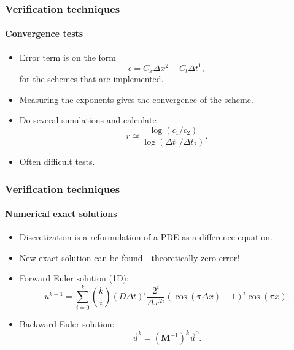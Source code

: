 \documentclass[12pt,a4paper, xcolor={usenames,dvipsnames,svgnames,table}]{beamer}
\begin{document}
\begin{frame}[shrink]
\frametitle{Verification techniques}
\framesubtitle{Convergence tests}
\begin{itemize}
 \item<1-> Error term is on the form
 \begin{equation*}
 \epsilon = C_x\Delta x^2 + C_t\Delta t^1,
\end{equation*}
for the schemes that are implemented.
\item<2-> Measuring the exponents gives the convergence of the scheme.
\item<3-> Do several simulations and calculate
\begin{equation*}
 r\simeq \frac{\log\left(\epsilon_1/\epsilon_2\right)}{\log\left(\Delta t_1/\Delta t_2\right)}.
\end{equation*}
\item<4-> Often difficult tests.
\end{itemize}
\end{frame}
\notetoself{}

\begin{frame}[shrink]
\frametitle{Verification techniques}
\framesubtitle{Numerical exact solutions}
\begin{itemize}
 \item <1-> Discretization is a reformulation of a PDE as a difference equation. 
 \item <2-> New exact solution can be found - theoretically zero error!
 \item <3-> Forward Euler solution (1D):
 \begin{equation*}
  u^{k+1} = \sum\limits_{i=0}^k {k\choose i}\left(D\Delta t\right)^i\frac{2^i}{\Delta x^{2i}}\left(\cos(\pi\Delta x)-1\right)^i\cos(\pi x).
 \end{equation*}
 \item <3-> Backward Euler solution:
 \begin{equation*}
   \vec u^{k} = \left(\mathbf M^{-1}\right)^{k} \vec u^0.
 \end{equation*}
\end{itemize}
\end{frame}
\end{document}
